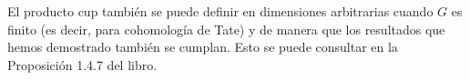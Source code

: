\documentclass[a4paper,12pt, leqno]{article}
\begin{document}


El producto cup también se puede definir en dimensiones arbitrarias cuando $G$ es finito (es decir, para cohomología de Tate) y de manera que los resultados que hemos demostrado también se cumplan. Esto se puede consultar en la Proposición 1.4.7 del libro. 
\end{document}
